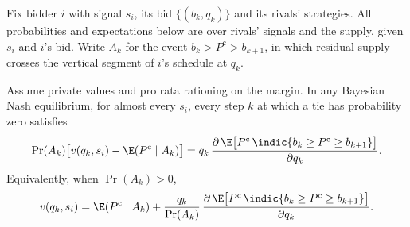  Fix bidder $i$ with signal $s_i$, its bid $\{(b_k,q_k)\}$ and its
rivals' strategies. All probabilities and expectations below are over rivals' signals and the supply, given
$s_i$ and $i$'s bid. Write $A_k$ for the event $b_k>P^{\mathrm c}>b_{k+1}$, in which residual supply crosses
the vertical segment of $i$'s schedule at $q_k$.

\begin{proposition}\label{prop:15-kastl}
Assume private values and pro rata rationing on the margin. In any Bayesian Nash equilibrium, for almost
every $s_i$, every step $k$ at which a tie has probability zero satisfies
\begin{equation}\label{eq:15-kastl-foc}
\Pr(A_k)\bigl[v(q_k,s_i)-\E(P^{\mathrm c}\mid A_k)\bigr]
=q_k\,\frac{\partial\,\E\bigl[P^{\mathrm c}\,\indic\{b_k\ge P^{\mathrm c}\ge b_{k+1}\}\bigr]}{\partial q_k} .
\end{equation}
Equivalently, when $\Pr(A_k)>0$,
\begin{equation}\label{eq:15-kastl-mcmr}
v(q_k,s_i)=\E(P^{\mathrm c}\mid A_k)
+\frac{q_k}{\Pr(A_k)}\,\frac{\partial\,\E\bigl[P^{\mathrm c}\,\indic\{b_k\ge P^{\mathrm c}\ge b_{k+1}\}\bigr]}{\partial q_k} .
\end{equation}
\end{proposition}

